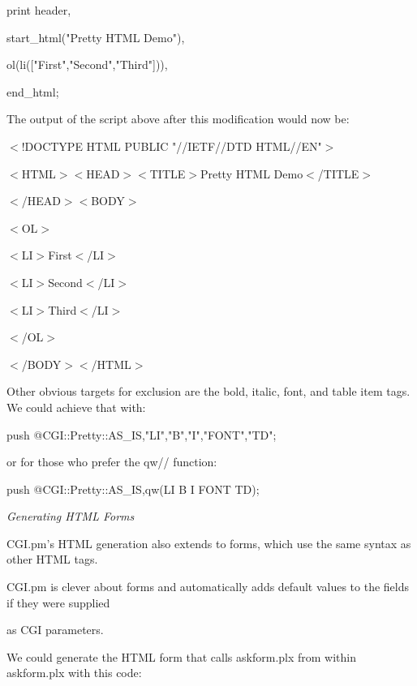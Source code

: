 \documentclass[a4paper,11pt]{book}
\begin{document}
\noindent print header,

\noindent start\_html("Pretty HTML Demo"),

\noindent ol(li(["First","Second","Third"])),

\noindent end\_html;

\noindent 

\noindent The output of the script above after this modification would now be:

\noindent 

\noindent $<$!DOCTYPE HTML PUBLIC "//IETF//DTD HTML//EN"$>$

\noindent $<$HTML$>$$<$HEAD$>$$<$TITLE$>$Pretty HTML Demo$<$/TITLE$>$

\noindent $<$/HEAD$>$$<$BODY$>$

\noindent $<$OL$>$

\noindent $<$LI$>$First$<$/LI$>$

\noindent $<$LI$>$Second$<$/LI$>$

\noindent $<$LI$>$Third$<$/LI$>$

\noindent $<$/OL$>$

\noindent $<$/BODY$>$$<$/HTML$>$

\noindent 

\noindent Other obvious targets for exclusion  are  the  bold,  italic,  font,  and  table  item  tags.  We  could  achieve that with:

\noindent 

\noindent push @CGI::Pretty::AS\_IS,"LI","B","I","FONT","TD";

\noindent 

\noindent or for those who  prefer the qw// function:

\noindent 

\noindent push @CGI::Pretty::AS\_IS,qw(LI B I FONT TD);

\noindent 

\noindent \textit{Generating HTML Forms}

\noindent CGI.pm's HTML generation also extends to forms, which use the same syntax as other HTML tags.

\noindent CGI.pm is clever about forms and automatically adds default values to the fields if they were supplied

\noindent as CGI parameters.

\noindent 

\noindent We could generate the HTML  form  that  calls  askform.plx from  within  askform.plx with this code:
\end{document}
